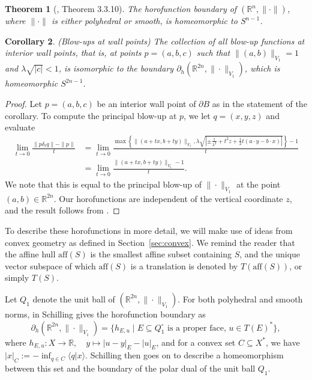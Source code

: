 \documentclass{article}
\newtheorem{theorem}{Theorem}[section]
\newtheorem{cor}[theorem]{Corollary}
\theoremstyle{definition}
\newcommand{\norm}[1]{\|#1\|}
\newcommand{\bhor}{\partial_h}
\newcommand{\aff}{\mathrm{aff}}
\newcommand{\R}{{\mathbb R}}
\begin{document}
\begin{theorem}[\cite{schilling-thesis}, Theorem 3.3.10]
The horofunction boundary of $(\R^n, \norm{\cdot})$, where $\norm{\cdot}$ is either polyhedral or smooth, is homeomorphic to $S^{n-1}$.
\end{theorem}


\begin{cor}{(Blow-ups at wall points)}
The collection of all blow-up functions at interior wall points, that is, at points $p = (a,b,c)$ such that $\norm{(a,b)}_{V_1} = 1$ and $\lambda\sqrt{|c|}<1$, is isomorphic to the boundary $\bhor(\R^{2n}, \norm{\cdot}_{V_1})$, which is homeomorphic $S^{2n-1}$.
\end{cor}

\begin{proof}
Let $p = (a,b,c)$ be an interior wall point of $\partial B$ as in the statement of the corollary. To compute the principal blow-up at $p$, we let $q = (x,y,z)$ and evaluate
\begin{align*}
\lim_{t\to0} \frac{\norm{p\delta_tq} - \norm{p}}{t} & = \lim_{t\to0}\frac{\max\left\{\norm{(a + tx, b + ty)}_{V_1}, \lambda\sqrt{|\pm \frac{1}{\lambda^2} + t^2z + \frac12 t(a\cdot y - b\cdot x)|}\right\} - 1}{t}\\
& =  \lim_{t\to0}\frac{\norm{(a + tx, b + ty)}_{V_1} - 1}{t}.
\end{align*}
We note that this is equal to the principal blow-up of $\norm{\cdot}_{V_1}$ at the point $(a,b)\in \R^{2n}$. Our horofunctions are independent of the vertical coordinate $z$, and the result follows from \cite{schilling-thesis}.
\end{proof}

To describe these horofunctions in more detail, we will make use of ideas from convex geometry as defined in Section~\ref{sec:convex}. We remind the reader that the affine hull $\aff(S)$ is the smallest affine subset containing $S$, and the unique vector subspace of which $\aff(S)$ is a translation is denoted by $T(\aff(S))$, or simply $T(S)$.

Let $Q_1$ denote the unit ball of $(\R^{2n},\norm{\cdot}_{V_1})$. For both polyhedral and smooth norms, in \cite{schilling-thesis} Schilling gives the horofunction boundary as
\[\bhor(\R^{2n},\norm{\cdot}_{V_1}) = \{h_{E,u}\mid E\subseteq Q_1^\circ \text{ is a proper face, } u \in T(E)^*\},\]
where $h_{E,u}: X \to \R, \quad y \mapsto |u - y|_E - |u|_E$,
and for a convex set $C \subseteq X^*$, we have  $|x|_C := -\inf_{q \in C} \langle q | x\rangle$. Schilling then goes on to describe a homeomorphism between this set and the boundary of the polar dual of the unit ball $Q_1$.
\end{document}
